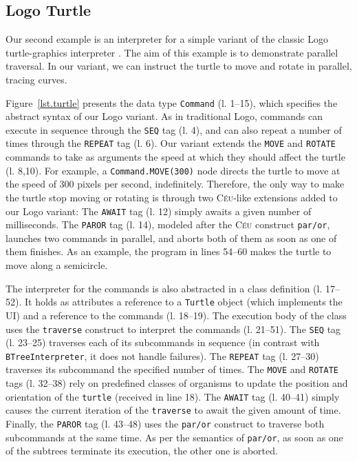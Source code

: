 \documentclass{sig-alternate}
\newcommand{\CEU}{\textsc{C\'{e}u}\xspace}
\newcommand{\code}[1] {{\small{\texttt{#1}}}}
\begin{document}
\subsection{Logo Turtle}
\label{sec.apps.turtle}

Our second example is an interpreter for a simple variant of the classic Logo
turtle-graphics interpreter \cite{papert.logo}.
The aim of this example is to demonstrate parallel traversal.
In our variant, we can instruct the turtle to move and rotate in parallel, 
tracing curves.


Figure~\ref{lst.turtle} presents the data type \code{Command} (l. 1--15), which 
specifies the abstract syntax of our Logo variant.
As in traditional Logo, commands can execute in sequence through the \code{SEQ} 
tag (l. 4), and can also repeat a number of times through the \code{REPEAT} 
tag (l. 6).
%
Our variant extends the \code{MOVE} and \code{ROTATE} commands to take as 
arguments the speed at which they should affect the turtle (l. 8,10).
For example, a \code{Command.MOVE(300)} node directs the turtle to move at the 
speed of 300 pixels per second, indefinitely.
%
Therefore, the only way to make the turtle stop moving or rotating is through 
two \CEU-like extensions added to our Logo variant:
The \code{AWAIT} tag (l. 12) simply awaits a given number of milliseconds.
The \code{PAROR} tag (l. 14), modeled after the \CEU construct \code{par/or},
launches two commands in parallel, and aborts both of them as soon as one of
them finishes.
%
As an example, the program in lines 54--60 makes the turtle to move along a 
semicircle.

The interpreter for the commands is also abstracted in a class definition 
(l. 17--52).
%
It holds as attributes a reference to a \code{Turtle} object (which implements 
the UI) and a reference to the commands (l. 18--19).
The execution body of the class uses the \code{traverse} construct to interpret 
the commands (l. 21--51).
%
The \code{SEQ} tag (l. 23--25) traverses each of its subcommands in sequence 
(in contrast with \code{BTreeInterpreter}, it does not handle failures).
%
The \code{REPEAT} tag (l. 27--30) traverses its subcommand the specified number 
of times.
%
The \code{MOVE} and \code{ROTATE} tags (l. 32--38) rely on 
predefined classes of organisms to update the position and orientation of the 
\code{turtle} (received in line 18).
%
The \code{AWAIT} tag (l. 40--41) simply causes the current iteration of the 
\code{traverse} to await the given amount of time.
%
Finally, the \code{PAROR} tag (l. 43--48) uses the \code{par/or} construct
to traverse both subcommands at the same time. As per the semantics of
\code{par/or}, as soon as one of the subtrees terminate its execution,
the other one is aborted.
\end{document}
